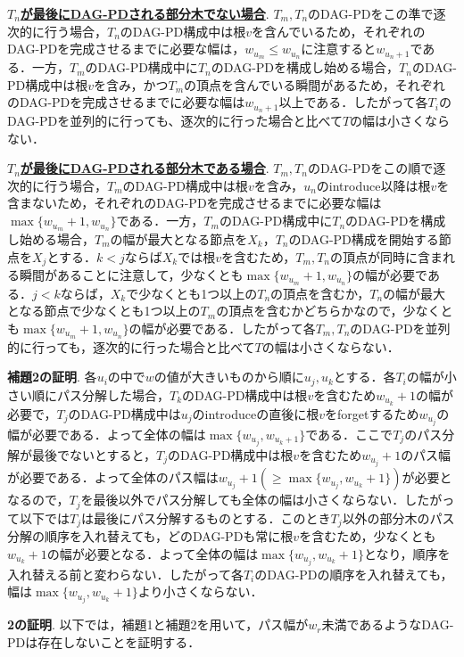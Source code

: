 \documentclass{kuisthesis}           %
\begin{document}
 \textbf{\underline{$T_n$が最後にDAG-PDされる部分木でない場合}}. 
 $T_m, T_n$のDAG-PDをこの準で逐次的に行う場合，$T_n$のDAG-PD構成中は根$v$を含んでいるため，それぞれのDAG-PDを完成させるまでに必要な幅は，$w_{u_m} \leq w_{u_n}$に注意すると$w_{u_n+1}$である．一方，$T_m$のDAG-PD構成中に$T_n$のDAG-PDを構成し始める場合，$T_n$のDAG-PD構成中は根$v$を含み，かつ$T_m$の頂点を含んでいる瞬間があるため，それぞれのDAG-PDを完成させるまでに必要な幅は$w_{u_n+1}$以上である．したがって各$T_i$のDAG-PDを並列的に行っても、逐次的に行った場合と比べて$T$の幅は小さくならない．

 \textbf{\underline{$T_n$が最後にDAG-PDされる部分木である場合}}.
 $T_m, T_n$のDAG-PDをこの順で逐次的に行う場合，$T_m$のDAG-PD構成中は根$v$を含み，$u_n$のintroduce以降は根$v$を含まないため，それぞれのDAG-PDを完成させるまでに必要な幅は$ \max\{w_{u_m}+1, w_{u_n}\}$である．一方，$T_m$のDAG-PD構成中に$T_n$のDAG-PDを構成し始める場合，$T_m$の幅が最大となる節点を$X_k$，$T_n$のDAG-PD構成を開始する節点を$X_j$とする．$k<j$ならば$X_k$では根$v$を含むため，$T_m, T_n$の頂点が同時に含まれる瞬間があることに注意して，少なくとも$ \max\{w_{u_m}+1, w_{u_n}\}$の幅が必要である．$j<k$ならば，$X_k$で少なくとも1つ以上の$T_n$の頂点を含むか，$T_n$の幅が最大となる節点で少なくとも1つ以上の$T_m$の頂点を含むかどちらかなので，少なくとも$ \max\{w_{u_m}+1, w_{u_n}\}$の幅が必要である．したがって各$T_m, T_n$のDAG-PDを並列的に行っても，逐次的に行った場合と比べて$T$の幅は小さくならない．


 \textbf{補題2の証明}.
 各$u_i$の中で$w$の値が大きいものから順に$u_j, u_k$とする．各$T_i$の幅が小さい順にパス分解した場合，$T_k$のDAG-PD構成中は根$v$を含むため$w_{u_k}+1$の幅が必要で，$T_j$のDAG-PD構成中は$u_j$のintroduceの直後に根$v$をforgetするため$w_{u_j}$の幅が必要である．よって全体の幅は$ \max\{w_{u_j}, w_{u_k+1}\}$である．ここで$T_j$のパス分解が最後でないとすると，$T_j$のDAG-PD構成中は根$v$を含むため$w_{u_j}+1$のパス幅が必要である．よって全体のパス幅は$w_{u_j}+1( \geq  \max\{w_{u_j}, w_{u_k}+1\})$が必要となるので，$T_j$を最後以外でパス分解しても全体の幅は小さくならない．したがって以下では$T_j$は最後にパス分解するものとする．このとき$T_j$以外の部分木のパス分解の順序を入れ替えても，どのDAG-PDも常に根$v$を含むため，少なくとも$w_{u_k}+1$の幅が必要となる．よって全体の幅は$ \max\{w_{u_j}, w_{u_k}+1\}$となり，順序を入れ替える前と変わらない．したがって各$T_i$のDAG-PDの順序を入れ替えても，幅は$ \max\{w_{u_j}, w_{u_k}+1\}$より小さくならない．

 
 \textbf{2の証明}.
 以下では，補題1と補題2を用いて，パス幅が$w_r$未満であるようなDAG-PDは存在しないことを証明する．
\end{document}
